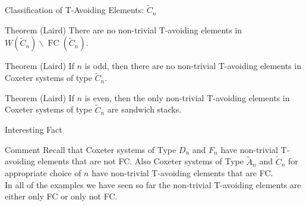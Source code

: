 \documentclass[9pt,handout]{beamer}
\DeclareMathOperator{\FC}{FC}
\newcommand{\C}{\widetilde{C}}
\begin{document}


\begin{frame}{Classification of T-Avoiding Elements: $\C_n$}

\begin{block}{Theorem (Laird)}
	There are no non-trivial T-avoiding elements in $W(\C_n)\backslash\FC(\C_n)$.
\end{block}
\pause
\begin{block}{Theorem (Laird)}
	If $n$ is odd, then there are no non-trivial T-avoiding elements in Coxeter systems of type $\C_n$.
\end{block}
\pause
\begin{block}{Theorem (Laird)}
	If $n$ is even, then the only non-trivial T-avoiding elements in Coxeter systems of type $\C_n$ are sandwich stacks.
\end{block}
	
\end{frame}




\begin{frame}{Interesting Fact}
\begin{block}{Comment}
Recall that Coxeter systems of Type $D_n$ and $F_n$ have non-trivial T-avoiding elements that are not FC. Also Coxeter systems of Type $\widetilde{A}_n$ and $\C_n$ for appropriate choice of $n$ have non-trivial T-avoiding elements that are FC. \\
\vspace{1em}
In all of the examples we have seen so far the non-trivial T-avoiding elements are either only FC or only not FC.	
\end{block}

	
\end{frame}
\end{document}
